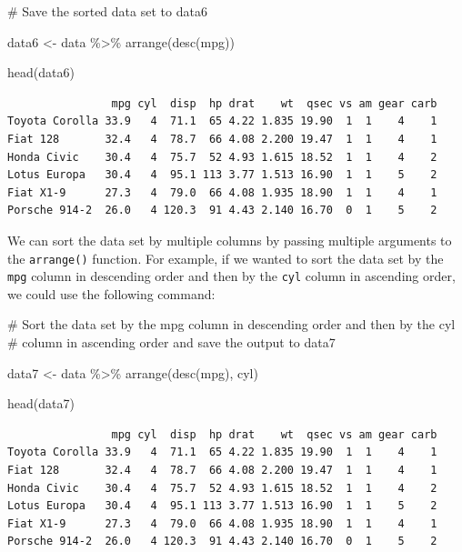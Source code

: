 \documentclass[
  letterpaper,
  DIV=11,
  numbers=noendperiod]{scrreprt}
\newenvironment{Shaded}{\begin{snugshade}}{\end{snugshade}}
\newcommand{\CommentTok}[1]{\textcolor[rgb]{0.37,0.37,0.37}{#1}}
\newcommand{\FunctionTok}[1]{\textcolor[rgb]{0.28,0.35,0.67}{#1}}
\newcommand{\NormalTok}[1]{\textcolor[rgb]{0.00,0.23,0.31}{#1}}
\newcommand{\OtherTok}[1]{\textcolor[rgb]{0.00,0.23,0.31}{#1}}
\newcommand{\SpecialCharTok}[1]{\textcolor[rgb]{0.37,0.37,0.37}{#1}}
\begin{document}
\begin{Shaded}
\begin{Highlighting}[]
\CommentTok{\# Save the sorted data set to data6}

\NormalTok{data6 }\OtherTok{\textless{}{-}}\NormalTok{ data }\SpecialCharTok{\%\textgreater{}\%}
  \FunctionTok{arrange}\NormalTok{(}\FunctionTok{desc}\NormalTok{(mpg))}

\FunctionTok{head}\NormalTok{(data6)}
\end{Highlighting}
\end{Shaded}

\begin{verbatim}
                mpg cyl  disp  hp drat    wt  qsec vs am gear carb
Toyota Corolla 33.9   4  71.1  65 4.22 1.835 19.90  1  1    4    1
Fiat 128       32.4   4  78.7  66 4.08 2.200 19.47  1  1    4    1
Honda Civic    30.4   4  75.7  52 4.93 1.615 18.52  1  1    4    2
Lotus Europa   30.4   4  95.1 113 3.77 1.513 16.90  1  1    5    2
Fiat X1-9      27.3   4  79.0  66 4.08 1.935 18.90  1  1    4    1
Porsche 914-2  26.0   4 120.3  91 4.43 2.140 16.70  0  1    5    2
\end{verbatim}

We can sort the data set by multiple columns by passing multiple
arguments to the \texttt{arrange()} function. For example, if we wanted
to sort the data set by the \texttt{mpg} column in descending order and
then by the \texttt{cyl} column in ascending order, we could use the
following command:

\begin{Shaded}
\begin{Highlighting}[]
\CommentTok{\# Sort the data set by the mpg column in descending order and then by the cyl }
\CommentTok{\# column in ascending order and save the output to data7}

\NormalTok{data7 }\OtherTok{\textless{}{-}}\NormalTok{ data }\SpecialCharTok{\%\textgreater{}\%}
  \FunctionTok{arrange}\NormalTok{(}\FunctionTok{desc}\NormalTok{(mpg), cyl)}

\FunctionTok{head}\NormalTok{(data7)}
\end{Highlighting}
\end{Shaded}

\begin{verbatim}
                mpg cyl  disp  hp drat    wt  qsec vs am gear carb
Toyota Corolla 33.9   4  71.1  65 4.22 1.835 19.90  1  1    4    1
Fiat 128       32.4   4  78.7  66 4.08 2.200 19.47  1  1    4    1
Honda Civic    30.4   4  75.7  52 4.93 1.615 18.52  1  1    4    2
Lotus Europa   30.4   4  95.1 113 3.77 1.513 16.90  1  1    5    2
Fiat X1-9      27.3   4  79.0  66 4.08 1.935 18.90  1  1    4    1
Porsche 914-2  26.0   4 120.3  91 4.43 2.140 16.70  0  1    5    2
\end{verbatim}
\end{document}
